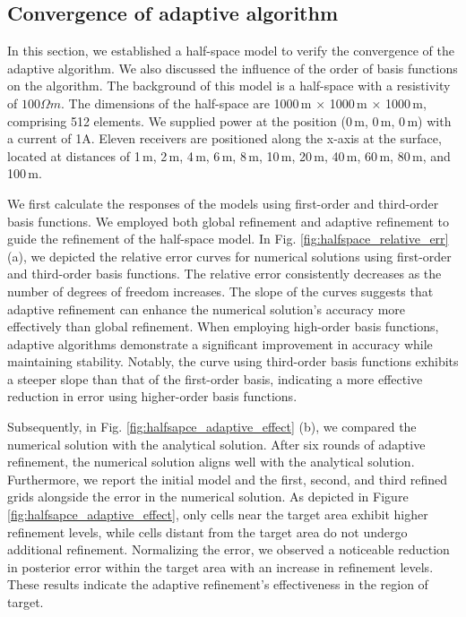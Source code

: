\documentclass[extra, referee]{gji}
\begin{document}
\subsection{Convergence of adaptive algorithm}
In this section, we established a half-space model to verify the convergence of
the adaptive algorithm. We also discussed the influence of the order of basis
functions on the algorithm. The background of this model is a half-space with a
resistivity of $100 \Omega m$. The dimensions of the half-space are 1000\,m ×
1000\,m × 1000\,m, comprising 512 elements. We supplied power at the position
(0\,m, 0\,m, 0\,m) with a current of 1A. Eleven receivers are positioned along
the x-axis at the surface, located at distances of 1\,m, 2\,m, 4\,m, 6\,m, 8\,m,
10\,m, 20\,m, 40\,m, 60\,m, 80\,m, and 100\,m.

We first calculate the responses of the models using first-order and third-order
basis functions. We employed both global refinement and adaptive refinement to
guide the refinement of the half-space model. In Fig. \ref{fig:halfspace_relative_err}
(a), we depicted the relative error curves for numerical solutions using
first-order and third-order basis functions. The relative error consistently
decreases as the number of degrees of freedom increases. The slope of the curves
suggests that adaptive refinement can enhance the numerical solution's accuracy
more effectively than global refinement. When employing high-order basis
functions, adaptive algorithms demonstrate a significant improvement in accuracy
while maintaining stability. Notably, the curve using third-order basis
functions exhibits a steeper slope than that of the first-order basis,
indicating a more effective reduction in error using higher-order basis
functions.

Subsequently, in Fig. \ref{fig:halfsapce_adaptive_effect} (b), we compared the numerical
solution with the analytical solution. After six rounds of adaptive refinement,
the numerical solution aligns well with the analytical solution. Furthermore, we
report the initial model and the first, second, and third refined grids
alongside the error in the numerical solution. As depicted in Figure
\ref{fig:halfsapce_adaptive_effect}, only cells near the target area exhibit higher refinement
levels, while cells distant from the target area do not undergo additional
refinement. Normalizing the error, we observed a noticeable reduction in
posterior error within the target area with an increase in refinement levels.
These results indicate the adaptive refinement's effectiveness in the region of
target.
\end{document}

